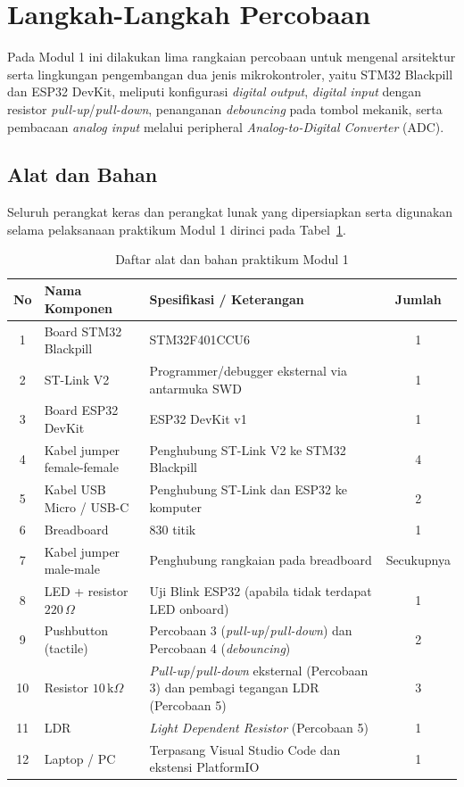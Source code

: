 \section{Langkah-Langkah Percobaan}
Pada Modul 1 ini dilakukan lima rangkaian percobaan untuk mengenal arsitektur serta lingkungan pengembangan dua jenis mikrokontroler, yaitu STM32 Blackpill dan ESP32 DevKit, meliputi konfigurasi \textit{digital output}, \textit{digital input} dengan resistor \textit{pull-up}/\textit{pull-down}, penanganan \textit{debouncing} pada tombol mekanik, serta pembacaan \textit{analog input} melalui peripheral \textit{Analog-to-Digital Converter} (ADC).

\subsection{Alat dan Bahan}

Seluruh perangkat keras dan perangkat lunak yang dipersiapkan serta digunakan selama pelaksanaan praktikum Modul 1 dirinci pada Tabel~\ref{tab:alat_bahan}.

\begin{table}[htbp]
    \centering
    \caption{Daftar alat dan bahan praktikum Modul 1}
    \label{tab:alat_bahan}
    \begin{tabularx}{\textwidth}{c l X c}
        \toprule
        \textbf{No} & \textbf{Nama Komponen} & \textbf{Spesifikasi / Keterangan} & \textbf{Jumlah} \\
        \midrule
        1  & Board STM32 Blackpill & STM32F401CCU6 & 1 \\
        2  & ST-Link V2 & Programmer/debugger eksternal via antarmuka SWD & 1 \\
        3  & Board ESP32 DevKit & ESP32 DevKit v1 & 1 \\
        4  & Kabel jumper female-female & Penghubung ST-Link V2 ke STM32 Blackpill & 4 \\
        5  & Kabel USB Micro / USB-C & Penghubung ST-Link dan ESP32 ke komputer & 2 \\
        6  & Breadboard & 830 titik & 1 \\
        7  & Kabel jumper male-male & Penghubung rangkaian pada breadboard & Secukupnya \\
        8  & LED + resistor $220\,\Omega$ & Uji Blink ESP32 (apabila tidak terdapat LED onboard) & 1 \\
        9  & Pushbutton (tactile) & Percobaan 3 (\textit{pull-up}/\textit{pull-down}) dan Percobaan 4 (\textit{debouncing}) & 2 \\
        10 & Resistor $10\,\text{k}\Omega$ & \textit{Pull-up}/\textit{pull-down} eksternal (Percobaan 3) dan pembagi tegangan LDR (Percobaan 5) & 3 \\
        11 & LDR & \textit{Light Dependent Resistor} (Percobaan 5) & 1 \\
        12 & Laptop / PC & Terpasang Visual Studio Code dan ekstensi PlatformIO & 1 \\
        \bottomrule
    \end{tabularx}
\end{table}

